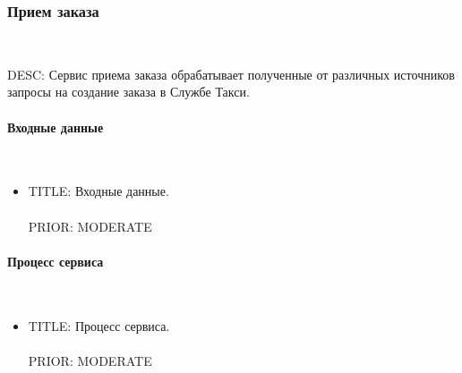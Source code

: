 \subsubsection{Прием заказа} \mbox{} \\ \label{service_reception_order}

    DESC: Сервис приема заказа обрабатывает полученные от различных источников запросы на создание заказа в Службе Такси. 

    \paragraph{Входные данные} \mbox{} \\ \label{}

        \begin{itemize}

          \item{

            TITLE: Входные данные.\\
            \\
            PRIOR: MODERATE\\

          }

        \end{itemize}

    \paragraph{Процесс сервиса} \mbox{} \\

        \begin{itemize}

         \item {
           TITLE: Процесс сервиса.\\
           \\
           PRIOR: MODERATE\\
         }

         \end{itemize}

